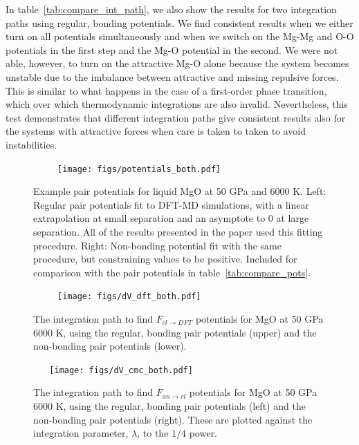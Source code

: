 In table~\ref{tab:compare_int_path}, we also show the results for two
integration paths using regular, bonding potentials. We find consistent
results when we either turn on all potentials simultaneously and when we
switch on the Mg-Mg and O-O potentials in the first step and the Mg-O
potential in the second. We were not able, however, to turn on the
attractive Mg-O alone because the system becomes unstable due to the
imbalance between attractive and missing repulsive forces. This is similar
to what happens in the case of a first-order phase transition, which over
which thermodynamic integrations are also invalid. Nevertheless, this test
demonstrates that different integration paths give consistent results also
for the systems with attractive forces when care is taken to taken to avoid
instabilities.


% 



\begin{figure}[h!]  
    \centering
    \texttt{[image: figs/potentials\_both.pdf]}
\caption{Example pair potentials for liquid MgO at 50 GPa and 6000 K. Left: 
  Regular pair potentials fit to DFT-MD simulations, with a linear
  extrapolation at small separation and an asymptote to 0 at large
  separation.  All of the results presented in the paper used this fitting
  procedure. Right: Non-bonding potential fit with the same procedure, but
  constraining values to be positive. Included for comparison with the pair
  potentials in table~\ref{tab:compare_pots}.}
\label{fig:potentials}
\end{figure}


\begin{figure}[h!]  
  \centering
    \texttt{[image: figs/dV\_dft\_both.pdf]}
\caption{The integration path to find $F_{cl \to DFT}$ potentials for MgO
at 50 GPa 6000 K, using the regular, bonding pair potentials (upper) and
the non-bonding pair potentials (lower). }
\label{fig:integrate_dft}
\end{figure}

\begin{figure}[h!]  
  \centering
  \texttt{[image: figs/dV\_cmc\_both.pdf]}
\caption{The integration path to find $F_{an \to cl}$ potentials for MgO at 50 GPa 6000
K, using the regular, bonding pair potentials (left) and
the non-bonding pair potentials (right). These are plotted against the
integration parameter, $\lambda$, to the $1/4$ power.}
\label{fig:integrate_cmc}
\end{figure}


